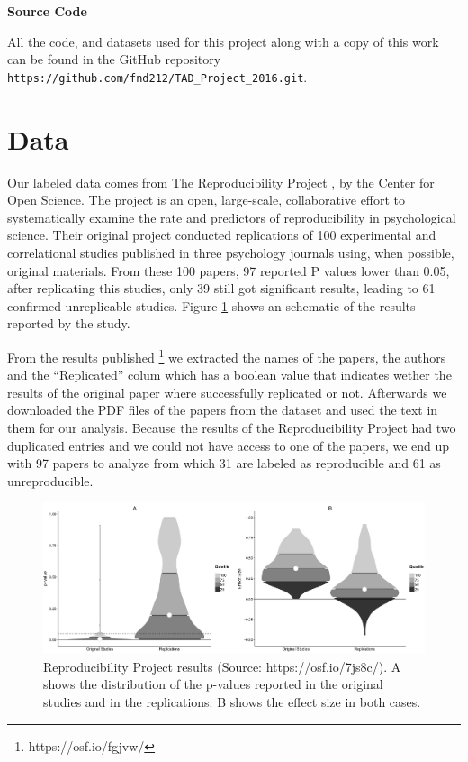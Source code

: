 \documentclass[12pt]{article}
\begin{document}
\textbf{Source Code}

All the code, and datasets used for this project along with a copy of this work can be found in the GitHub repository \texttt{https://github.com/fnd212/TAD\_Project\_2016.git}.


\section{Data} 

Our labeled data comes from The Reproducibility Project \cite{rep_proj}, by the Center for Open Science. The project is an open, large-scale, collaborative effort to systematically examine the rate and predictors of reproducibility in psychological science. Their original project conducted replications of 100 experimental and correlational studies published in three psychology journals using, when possible, original materials. From these 100 papers, 97 reported P values lower than 0.05, after replicating this studies, only 39 still got significant results, leading to 61 confirmed unreplicable studies. Figure \ref{fig:replication} shows an schematic of the results reported by the study. 

From the results published \footnote{https://osf.io/fgjvw/} we extracted the names of the papers, the authors and the ``Replicated'' colum which has a boolean value that indicates wether the results of the original paper where successfully replicated or not. Afterwards we downloaded the PDF files of the papers from the dataset and used the text in them for our analysis. Because the results of the Reproducibility Project had two duplicated entries and we could not have access to one of the papers, we end up with 97 papers to analyze from which 31 are labeled as reproducible and 61 as unreproducible.

\begin{figure}[htbp]
    \centering
    \includegraphics[width=1\textwidth]{dataset_structure}
    \caption{Reproducibility Project results (Source: https://osf.io/7js8c/). A shows the distribution of the p-values reported in the original studies and in the replications. B shows the effect size in both cases.}
    \label{fig:replication}
\end{figure}
\end{document}
